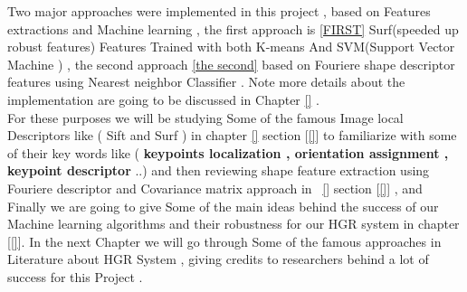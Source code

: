 Two major approaches were implemented in this project ,  based on Features extractions and Machine learning , the first approach  is \ref{FIRST} Surf(speeded up robust features) Features Trained with both K-means And SVM(Support Vector Machine ) , the second approach \ref{the second} based on Fouriere  shape descriptor  features using Nearest neighbor Classifier . Note more details about the implementation are going to be discussed in Chapter \ref{} . \\
For these purposes we will be studying  Some of the famous Image local Descriptors like ( Sift and Surf )  in chapter  \ref{} section [\ref {}]  to familiarize with some of their key words like ( \textbf{keypoints localization , orientation assignment , keypoint descriptor} ..)  and  then  reviewing shape feature extraction using Fouriere descriptor and Covariance matrix approach in \ \ref{} section [\ref {}] , and Finally we are going to give Some of the main ideas behind the success of our Machine learning algorithms and their robustness for our HGR system  in chapter [\ref{}].
In the next Chapter we will go through Some of the famous approaches in  Literature about HGR  System , giving credits  to researchers behind a lot of success for this Project .




